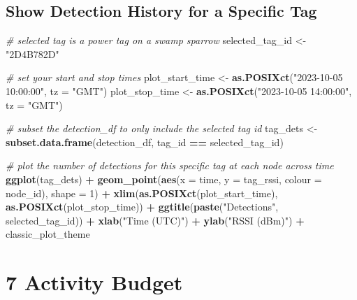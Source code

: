 \documentclass[
]{book}
\newenvironment{Shaded}{\begin{snugshade}}{\end{snugshade}}
\newcommand{\AttributeTok}[1]{\textcolor[rgb]{0.13,0.29,0.53}{#1}}
\newcommand{\CommentTok}[1]{\textcolor[rgb]{0.56,0.35,0.01}{\textit{#1}}}
\newcommand{\DecValTok}[1]{\textcolor[rgb]{0.00,0.00,0.81}{#1}}
\newcommand{\FunctionTok}[1]{\textcolor[rgb]{0.13,0.29,0.53}{\textbf{#1}}}
\newcommand{\NormalTok}[1]{#1}
\newcommand{\OtherTok}[1]{\textcolor[rgb]{0.56,0.35,0.01}{#1}}
\newcommand{\SpecialCharTok}[1]{\textcolor[rgb]{0.81,0.36,0.00}{\textbf{#1}}}
\newcommand{\StringTok}[1]{\textcolor[rgb]{0.31,0.60,0.02}{#1}}
\begin{document}
\section{Show Detection History for a Specific Tag}\label{show-detection-history-for-a-specific-tag}

\begin{Shaded}
\begin{Highlighting}[]
\CommentTok{\# selected tag is a power tag on a swamp sparrow}
\NormalTok{selected\_tag\_id }\OtherTok{\textless{}{-}} \StringTok{"2D4B782D"}

\CommentTok{\# set your start and stop times}
\NormalTok{plot\_start\_time }\OtherTok{\textless{}{-}} \FunctionTok{as.POSIXct}\NormalTok{(}\StringTok{"2023{-}10{-}05 10:00:00"}\NormalTok{, }\AttributeTok{tz =} \StringTok{"GMT"}\NormalTok{)}
\NormalTok{plot\_stop\_time }\OtherTok{\textless{}{-}} \FunctionTok{as.POSIXct}\NormalTok{(}\StringTok{"2023{-}10{-}05 14:00:00"}\NormalTok{, }\AttributeTok{tz =} \StringTok{"GMT"}\NormalTok{)}

\CommentTok{\# subset the detection\_df to only include the selected tag id}
\NormalTok{tag\_dets }\OtherTok{\textless{}{-}} \FunctionTok{subset.data.frame}\NormalTok{(detection\_df, tag\_id }\SpecialCharTok{==}\NormalTok{ selected\_tag\_id)}

\CommentTok{\# plot the number of detections for this specific tag at each node across time}
\FunctionTok{ggplot}\NormalTok{(tag\_dets) }\SpecialCharTok{+}
  \FunctionTok{geom\_point}\NormalTok{(}\FunctionTok{aes}\NormalTok{(}\AttributeTok{x =}\NormalTok{ time, }
                 \AttributeTok{y =}\NormalTok{ tag\_rssi, }
                 \AttributeTok{colour =}\NormalTok{ node\_id), }
             \AttributeTok{shape =} \DecValTok{1}\NormalTok{) }\SpecialCharTok{+}
  \FunctionTok{xlim}\NormalTok{(}\FunctionTok{as.POSIXct}\NormalTok{(plot\_start\_time), }
       \FunctionTok{as.POSIXct}\NormalTok{(plot\_stop\_time)) }\SpecialCharTok{+}
  \FunctionTok{ggtitle}\NormalTok{(}\FunctionTok{paste}\NormalTok{(}\StringTok{"Detections"}\NormalTok{, }
\NormalTok{                selected\_tag\_id)) }\SpecialCharTok{+}
  \FunctionTok{xlab}\NormalTok{(}\StringTok{"Time (UTC)"}\NormalTok{) }\SpecialCharTok{+}
  \FunctionTok{ylab}\NormalTok{(}\StringTok{"RSSI (dBm)"}\NormalTok{) }\SpecialCharTok{+}
\NormalTok{  classic\_plot\_theme}
\end{Highlighting}
\end{Shaded}

\chapter{7 Activity Budget}\label{activity-budget}
\end{document}
